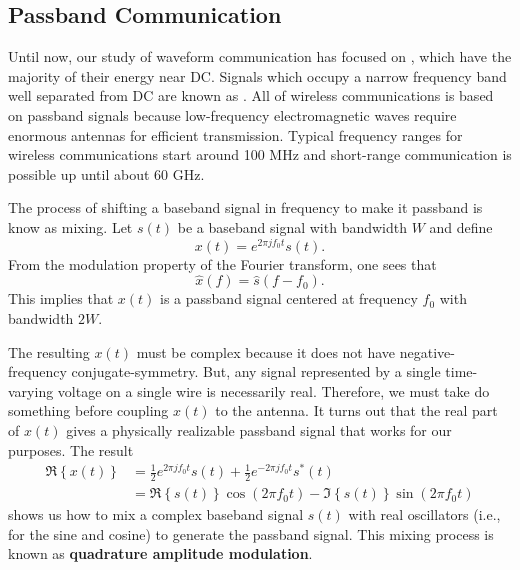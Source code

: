 \subsection{Passband Communication}

Until now, our study of waveform communication has focused on , which have the majority of their energy near DC.
Signals which occupy a narrow frequency band well separated from DC are known as .
All of wireless communications is based on passband signals because low-frequency electromagnetic waves require enormous antennas for efficient transmission.
Typical frequency ranges for wireless communications start around 100 MHz and short-range communication is possible up until about 60 GHz.

The process of shifting a baseband signal in frequency to make it passband is know as mixing.
Let $s(t)$ be a baseband signal with bandwidth $W$ and define
\[ x(t) = e^{2\pi j f_0 t} s(t). \]
From the modulation property of the Fourier transform, one sees that
\[ \hat{x}(f) = \hat{s}(f-f_0). \]
This implies that $x(t)$ is a passband signal centered at frequency $f_0$ with bandwidth $2W$.

The resulting $x(t)$ must be complex because it does not have negative-frequency conjugate-symmetry.
But, any signal represented by a single time-varying voltage on a single wire is necessarily real.
Therefore, we must take do something before coupling $x(t)$ to the antenna.
It turns out that the real part of $x(t)$ gives a physically realizable passband signal that works for our purposes.
The result
\begin{align*}
\Re \left\{ x(t) \right \}
& = \frac{1}{2} e^{2\pi j f_0 t} s(t) + \frac{1}{2}  e^{-2\pi j f_0 t} s^* (t) \\
& = \Re \left\{ s(t) \right\} \cos(2 \pi f_0 t) - \Im \left\{ s(t) \right\} \sin (2\pi f_0 t)
\end{align*}
shows us how to mix a complex baseband signal $s(t)$ with real oscillators (i.e., for the sine and cosine) to generate the passband signal.
This mixing process is known as \textbf{quadrature amplitude modulation}.

